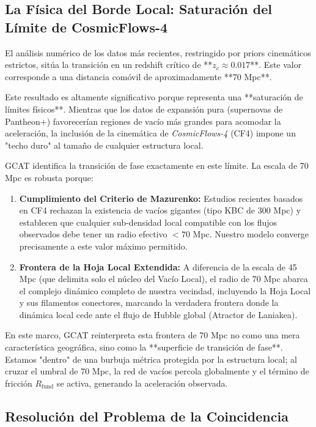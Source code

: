 \documentclass[12pt, a4paper]{article}
\theoremstyle{plain}
\theoremstyle{definition}
\begin{document}
\subsection{La Física del Borde Local: Saturación del Límite de CosmicFlows-4}

El análisis numérico de los datos más recientes, restringido por priors cinemáticos estrictos, sitúa la transición en un redshift crítico de **$z_c \approx 0.017$**. Este valor corresponde a una distancia comóvil de aproximadamente **70 Mpc**.

Este resultado es altamente significativo porque representa una **saturación de límites físicos**. Mientras que los datos de expansión pura (supernovas de Pantheon+) favorecerían regiones de vacío más grandes para acomodar la aceleración, la inclusión de la cinemática de \textit{CosmicFlows-4} (CF4) impone un "techo duro" al tamaño de cualquier estructura local.

GCAT identifica la transición de fase exactamente en este límite. La escala de 70 Mpc es robusta porque:

\begin{enumerate}
    \item \textbf{Cumplimiento del Criterio de Mazurenko:} Estudios recientes basados en CF4 \cite{Mazurenko2024} rechazan la existencia de vacíos gigantes (tipo KBC de 300 Mpc) y establecen que cualquier sub-densidad local compatible con los flujos observados debe tener un radio efectivo $< 70$ Mpc. Nuestro modelo converge precisamente a este valor máximo permitido.
    
    \item \textbf{Frontera de la Hoja Local Extendida:} A diferencia de la escala de 45 Mpc (que delimita solo el núcleo del Vacío Local), el radio de 70 Mpc abarca el complejo dinámico completo de nuestra vecindad, incluyendo la Hoja Local y sus filamentos conectores, marcando la verdadera frontera donde la dinámica local cede ante el flujo de Hubble global (Atractor de Laniakea).
\end{enumerate}

En este marco, GCAT reinterpreta esta frontera de 70 Mpc no como una mera característica geográfica, sino como la **superficie de transición de fase**. Estamos "dentro" de una burbuja métrica protegida por la estructura local; al cruzar el umbral de 70 Mpc, la red de vacíos percola globalmente y el término de fricción $R_{\text{fund}}$ se activa, generando la aceleración observada.

\subsection{Resolución del Problema de la Coincidencia}
\end{document}
